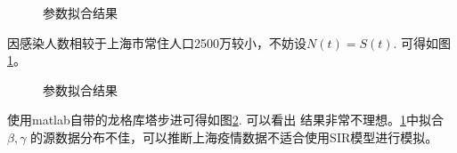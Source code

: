 \documentclass[a4paper]{book}
\numberwithin{equation}{chapter}
\theoremstyle{definition}
\begin{document}
\begin{figure}
  \centering
  \hfill
  \label{fig:betagamma}
  \caption{参数拟合结果}
\end{figure}
因感染人数相较于上海市常住人口2500万较小，不妨设$N(t) = S(t)$.
可得如图\ref{fig:betagamma}。

\begin{figure}
  \centering
  \hfill
  \label{fig:RIt}
  \caption{参数拟合结果}
\end{figure}
使用matlab自带的龙格库塔步进可得如图\ref{fig:RIt}. 可以看出
结果非常不理想。\ref{fig:betagamma}中拟合$\beta, \gamma$
的源数据分布不佳，可以推断上海疫情数据不适合使用SIR模型进行模拟。
\end{document}
